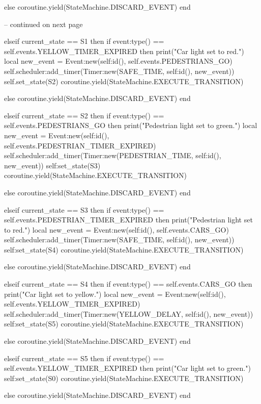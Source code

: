 \begin{appendices}
\begin{luacode}
			else
				coroutine.yield(StateMachine.DISCARD_EVENT)
			end

-- continued on next page
\end{luacode}

\begin{listing}[htp]
\begin{luacode}
		elseif current_state == S1 then
			if event:type() == self.events.YELLOW_TIMER_EXPIRED then
				print("Car light set to red.")
				local new_event = Event:new(self:id(), self.events.PEDESTRIANS_GO)
				self.scheduler:add_timer(Timer:new(SAFE_TIME, self:id(), new_event))
				self.set_state(S2)
				coroutine.yield(StateMachine.EXECUTE_TRANSITION)

			else
				coroutine.yield(StateMachine.DISCARD_EVENT)
			end
			
		elseif current_state == S2 then
			if event:type() == self.events.PEDESTRIANS_GO then
				print("Pedestrian light set to green.")
				local new_event = Event:new(self:id(), self.events.PEDESTRIAN_TIMER_EXPIRED)
				self.scheduler:add_timer(Timer:new(PEDESTRIAN_TIME, self:id(), new_event))
				self:set_state(S3)
				coroutine.yield(StateMachine.EXECUTE_TRANSITION)

			else
				coroutine.yield(StateMachine.DISCARD_EVENT)
			end

		elseif current_state == S3 then
			if event:type() == self.events.PEDESTRIAN_TIMER_EXPIRED then
				print("Pedestrian light set to red.")
				local new_event = Event:new(self:id(), self.events.CARS_GO)
				self.scheduler:add_timer(Timer:new(SAFE_TIME, self:id(), new_event))
				self:set_state(S4)
				coroutine.yield(StateMachine.EXECUTE_TRANSITION)

			else
				coroutine.yield(StateMachine.DISCARD_EVENT)
			end

		elseif current_state == S4 then
			if event:type() == self.events.CARS_GO then
				print("Car light set to yellow.")
				local new_event = Event:new(self:id(), self.events.YELLOW_TIMER_EXPIRED)
				self.scheduler:add_timer(Timer:new(YELLOW_DELAY, self:id(), new_event))
				self:set_state(S5)
				coroutine.yield(StateMachine.EXECUTE_TRANSITION)

			else
				coroutine.yield(StateMachine.DISCARD_EVENT)
			end

		elseif current_state == S5 then
			if event:type() == self.events.YELLOW_TIMER_EXPIRED then
				print("Car light set to green.")
				self:set_state(S0)
				coroutine.yield(StateMachine.EXECUTE_TRANSITION)
			
			else
				coroutine.yield(StateMachine.DISCARD_EVENT)
			end


\end{luacode}
\end{listing}
\end{appendices}
